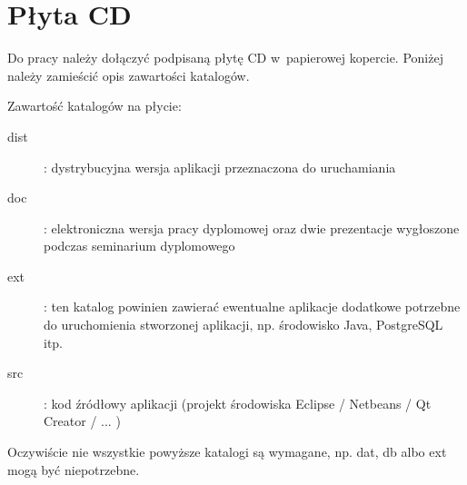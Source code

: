 \chapter{Płyta CD}\label{app:plyta}

\begin{figure}[htb]
\makebox[\textwidth]{\framebox[12.8cm]{\rule{0pt}{12.8cm}}}
\end{figure}
\pagebreak
{\color{red} Do pracy należy dołączyć podpisaną płytę CD w~papierowej
  kopercie.  Poniżej należy zamieścić opis zawartości katalogów.}

Zawartość katalogów na płycie:
\begin{description}
\item[dist] : dystrybucyjna wersja aplikacji przeznaczona do uruchamiania
\item[doc] : elektroniczna wersja pracy dyplomowej oraz dwie prezentacje
  wygłoszone podczas seminarium dyplomowego
\item[ext] : {\color{red} ten katalog powinien zawierać ewentualne aplikacje
  dodatkowe potrzebne do uruchomienia stworzonej aplikacji, np. środowisko Java,
  PostgreSQL itp.}
\item[src] : kod źródłowy aplikacji {\color{red}(projekt środowiska Eclipse /
  Netbeans / Qt Creator / ... })
\end{description}

{\color{red} Oczywiście nie wszystkie powyższe katalogi są wymagane, np. dat, db
  albo ext mogą być niepotrzebne.}

